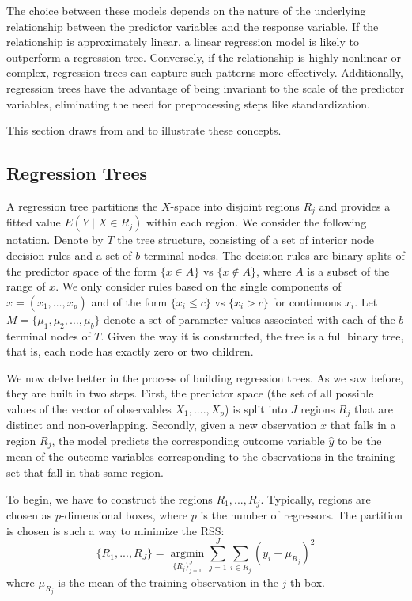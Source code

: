 \documentclass[a4paper,11pt]{article}
\begin{document}
The choice between these models depends on the nature of the underlying relationship between the predictor variables and the response variable. If the relationship is approximately linear, a linear regression model is likely to outperform a regression tree. Conversely, if the relationship is highly nonlinear or complex, regression trees can capture such patterns more effectively. Additionally, regression trees have the advantage of being invariant to the scale of the predictor variables, eliminating the need for preprocessing steps like standardization.

This section draws from \cite[Chapter~8]{jamesIntroductionStatisticalLearning2021} and \cite{Genuer_Poggi_2020} to illustrate these concepts.

\subsection{Regression Trees}
A regression tree partitions the \(X\)-space into disjoint regions \(R_j\) and provides a fitted value \(E(Y \mid X \in R_j)\) within each region.
We consider the following notation. Denote by \( T \) the tree structure, consisting of a set of interior node decision rules and a set of $b$ terminal nodes. The decision rules are binary splits of the predictor space of the form \( \{x \in A\} \) vs \( \{x \notin A\} \), where \( A \) is a subset of the range of \( x \). We only consider rules based on the single components of \( x = (x_1, \dots, x_p) \) and of the form \( \{x_i \leq c\} \) vs \( \{x_i > c\} \) for continuous \( x_i \). Let \( M = \{\mu_1, \mu_2, \dots, \mu_b\} \) denote a set of parameter values associated with each of the \( b \) terminal nodes of \( T \). Given the way it is constructed, the tree is a full binary tree, that is, each node has exactly zero or two children. 

We now delve better in the process of building regression trees. As we saw before, they are built in two steps. First, the predictor space (the set of all possible values of the vector of observables $X_1, ...., X_p$) is split into $J$ regions $R_j$ that are distinct and non-overlapping. Secondly, given a new observation $x$ that falls in a region $R_j$, the model predicts the corresponding outcome variable $\hat{y}$ to be the mean of the outcome variables corresponding to the observations in the training set that fall in that same region.



To begin, we have to construct the regions $R_1,..., R_j$. Typically, regions are chosen as $p$-dimensional boxes, where $p$ is the number of regressors. The partition is chosen is such a way to minimize the RSS:  
\begin{equation}
  \{R_1,...,R_J \}=\operatorname*{argmin}_{ \{R_j\}_{j=1}^J}\sum^J_{j=1}\sum_{i\in R_j}\left(y_i-\mu_{R_j}\right)^2
  \label{rss_tree}
\end{equation}
where $\mu_{R_j}$ is the mean of the training observation in the $j$-th box.
\end{document}
